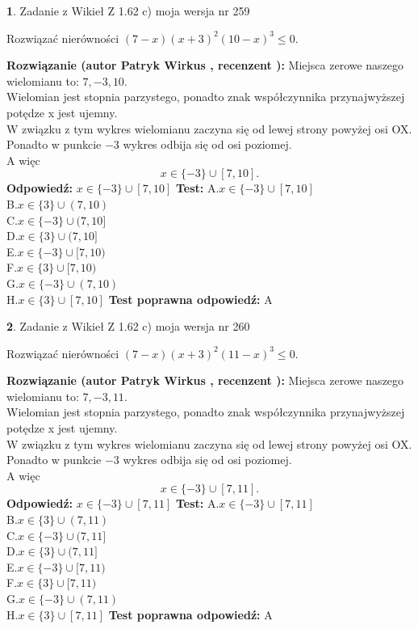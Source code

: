 \documentclass[12pt, a4paper]{article}
\theoremstyle{definition} %
\newtheorem{zad}{}
\newcommand{\zadStart}[1]{\begin{zad}#1\newline}
\newcommand{\zadStop}{\end{zad}}
\newcommand{\rozwStart}[2]{\noindent \textbf{Rozwiązanie (autor #1 , recenzent #2): }\newline}
\newcommand{\rozwStop}{\newline}
\newcommand{\odpStart}{\noindent \textbf{Odpowiedź:}\newline}
\newcommand{\odpStop}{\newline}
\newcommand{\testStart}{\noindent \textbf{Test:}\newline}
\newcommand{\testStop}{\newline}
\newcommand{\kluczStart}{\noindent \textbf{Test poprawna odpowiedź:}\newline}
\newcommand{\kluczStop}{\newline}
\begin{document}
\zadStart{Zadanie z Wikieł Z 1.62 c) moja wersja nr 259}

Rozwiązać nierówności $(7-x)(x+3)^{2}(10-x)^{3}\le0$.
\zadStop
\rozwStart{Patryk Wirkus}{}
Miejsca zerowe naszego wielomianu to: $7, -3, 10$.\\
Wielomian jest stopnia parzystego, ponadto znak współczynnika przy\linebreak najwyższej potędze x jest ujemny.\\ W związku z tym wykres wielomianu zaczyna się od lewej strony powyżej osi OX.\\
Ponadto w punkcie $-3$ wykres odbija się od osi poziomej.\\
A więc $$x \in \{-3\} \cup [7,10].$$
\rozwStop
\odpStart
$x \in \{-3\} \cup [7,10]$
\odpStop
\testStart
A.$x \in \{-3\} \cup [7,10]$\\
B.$x \in \{3\} \cup (7,10)$\\
C.$x \in \{-3\} \cup (7,10]$\\
D.$x \in \{3\} \cup (7,10]$\\
E.$x \in \{-3\} \cup [7,10)$\\
F.$x \in \{3\} \cup [7,10)$\\
G.$x \in \{-3\} \cup (7,10)$\\
H.$x \in \{3\} \cup [7,10]$
\testStop
\kluczStart
A
\kluczStop



\zadStart{Zadanie z Wikieł Z 1.62 c) moja wersja nr 260}

Rozwiązać nierówności $(7-x)(x+3)^{2}(11-x)^{3}\le0$.
\zadStop
\rozwStart{Patryk Wirkus}{}
Miejsca zerowe naszego wielomianu to: $7, -3, 11$.\\
Wielomian jest stopnia parzystego, ponadto znak współczynnika przy\linebreak najwyższej potędze x jest ujemny.\\ W związku z tym wykres wielomianu zaczyna się od lewej strony powyżej osi OX.\\
Ponadto w punkcie $-3$ wykres odbija się od osi poziomej.\\
A więc $$x \in \{-3\} \cup [7,11].$$
\rozwStop
\odpStart
$x \in \{-3\} \cup [7,11]$
\odpStop
\testStart
A.$x \in \{-3\} \cup [7,11]$\\
B.$x \in \{3\} \cup (7,11)$\\
C.$x \in \{-3\} \cup (7,11]$\\
D.$x \in \{3\} \cup (7,11]$\\
E.$x \in \{-3\} \cup [7,11)$\\
F.$x \in \{3\} \cup [7,11)$\\
G.$x \in \{-3\} \cup (7,11)$\\
H.$x \in \{3\} \cup [7,11]$
\testStop
\kluczStart
A
\kluczStop
\end{document}
